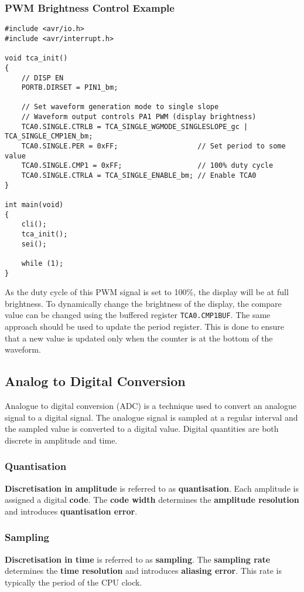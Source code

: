 \documentclass{article}
\begin{document}
\subsubsection{PWM Brightness Control Example}
\begin{verbatim}
#include <avr/io.h>
#include <avr/interrupt.h>

void tca_init()
{
    // DISP EN
    PORTB.DIRSET = PIN1_bm;

    // Set waveform generation mode to single slope
    // Waveform output controls PA1 PWM (display brightness)
    TCA0.SINGLE.CTRLB = TCA_SINGLE_WGMODE_SINGLESLOPE_gc | TCA_SINGLE_CMP1EN_bm;
    TCA0.SINGLE.PER = 0xFF;                   // Set period to some value
    TCA0.SINGLE.CMP1 = 0xFF;                  // 100% duty cycle
    TCA0.SINGLE.CTRLA = TCA_SINGLE_ENABLE_bm; // Enable TCA0
}

int main(void)
{
    cli();
    tca_init();
    sei();

    while (1);
}
\end{verbatim}
As the duty cycle of this PWM signal is set to 100\%, the display will
be at full brightness. To dynamically change the brightness of the
display, the compare value can be changed using the buffered register
\texttt{TCA0.CMP1BUF}. The same approach should be used to
update the period register. This is done to ensure that a new value is
updated only when the counter is at the bottom of the waveform.
\subsection{Analog to Digital Conversion}
Analogue to digital conversion (ADC) is a technique used to convert an
analogue signal to a digital signal. The analogue signal is sampled at
a regular interval and the sampled value is converted to a digital
value. Digital quantities are both discrete in amplitude and time.
\subsubsection{Quantisation}
\textbf{Discretisation in amplitude} is referred to as
\textbf{quantisation}. Each amplitude is assigned a digital
\textbf{code}. The \textbf{code width} determines the \textbf{amplitude
    resolution} and introduces \textbf{quantisation error}.
\subsubsection{Sampling}
\textbf{Discretisation in time} is referred to as \textbf{sampling}. The
\textbf{sampling rate} determines the \textbf{time resolution} and
introduces \textbf{aliasing error}. This rate is typically the period of
the CPU clock.
\end{document}
